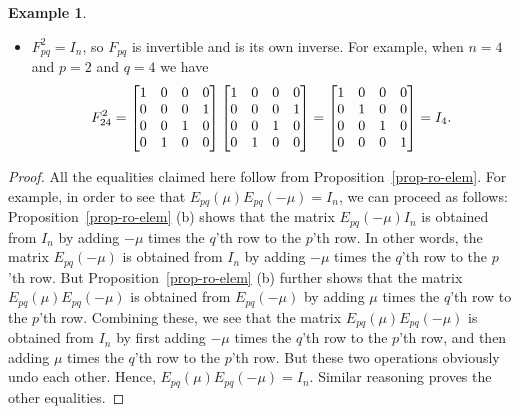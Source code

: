 \documentclass[reqno]{amsart}
\theoremstyle{definition}
\newtheorem{example}[theorem]{Example}
\begin{document}
\begin{example}
\begin{itemize}
\[   \] 
  \item[(c)] $F_{pq}^2=I_n$, so $F_{pq}$ is invertible and is its own
   inverse.  For example, when $n=4$ and $p=2$ and $q=4$ we have 
   \[ 
    F_{24}^2 =
    \left[\begin{matrix} 1&0&0&0 \\ 0&0&0&1 \\ 0&0&1&0 \\ 0&1&0&0 \end{matrix}\right]
    \left[\begin{matrix} 1&0&0&0 \\ 0&0&0&1 \\ 0&0&1&0 \\ 0&1&0&0 \end{matrix}\right]
    =
    \left[\begin{matrix} 1&0&0&0 \\ 0&1&0&0 \\ 0&0&1&0 \\ 0&0&0&1 \end{matrix}\right]
    = I_4.
   \] 
 \end{itemize}
\end{example}

\begin{proof}
All the equalities claimed here follow from Proposition~\ref{prop-ro-elem}.
For example, in order to see that $E_{pq}(\mu) E_{pq}(-\mu) = I_n$, we can
proceed as follows: Proposition~\ref{prop-ro-elem} (b) shows that the
matrix $E_{pq}(-\mu) I_n$ is obtained from $I_n$ by adding $-\mu$ times
the $q$'th row to the $p$'th row. In other words, the matrix $E_{pq}(-\mu)$
is obtained from $I_n$ by adding $-\mu$ times the $q$'th row to the $p$'th
row. But Proposition~\ref{prop-ro-elem} (b) further shows that the matrix
$E_{pq}(\mu) E_{pq}(-\mu)$ is obtained from $E_{pq}(-\mu)$ by adding $\mu$
times the $q$'th row to the $p$'th row. Combining these, we see that the
matrix $E_{pq}(\mu) E_{pq}(-\mu)$ is obtained from $I_n$ by first adding
$-\mu$ times the $q$'th row to the $p$'th row, and then adding $\mu$ times
the $q$'th row to the $p$'th row. But these two operations obviously undo
each other. Hence, $E_{pq}(\mu) E_{pq}(-\mu) = I_n$.
Similar reasoning proves the other equalities.
\end{proof}
\end{document}
